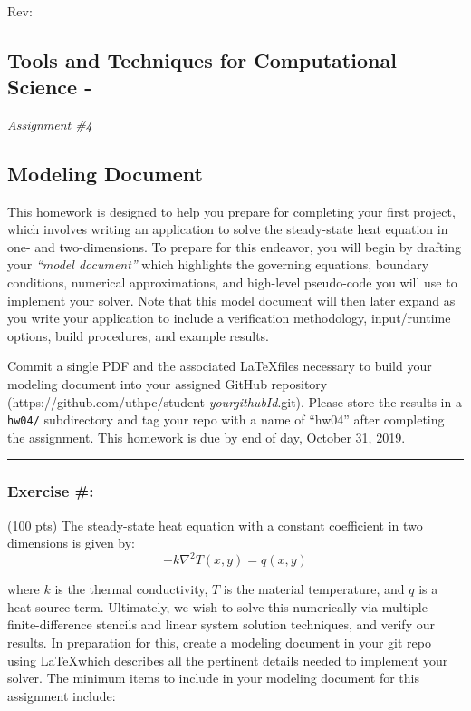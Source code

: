 \documentclass[letterpaper,12pt]{article}
\newcounter{exanum}
\newcommand{\exercise}{\subsubsection*{Exercise \#\theexanum: \refstepcounter{exanum}}}
\newcommand{\duedate}{end of day, October 31, 2019}
\begin{document}
\begin{flushright}
\VCDateISO \\
Rev: \VCRevision
\end{flushright}

\vspace*{0.05cm}
\subsection*{Tools and Techniques for Computational Science - \courseyear{}}
\vspace*{-.2cm}
{{\large \em Assignment \#4}

\vspace*{5pt}

\subsection*{Modeling Document}

This homework is designed to help you prepare for completing your
first project, which involves writing an application to solve the steady-state heat
equation in one- and two-dimensions. To prepare for this endeavor, you will
begin by drafting your {\em ``model document''} which highlights the
governing equations, boundary conditions, numerical approximations,
and high-level pseudo-code you will use to implement your
solver. Note that this model document will then later expand as you write your
application to include a verification methodology, input/runtime
options, build procedures, and example results.

Commit a single PDF and the associated \LaTeX files necessary to build your
modeling document into 
your assigned GitHub repository
(https://github.com/uthpc/student-{\em yourgithubId}.git).  Please
store the results in a \texttt{hw04/} subdirectory and tag your repo with a
name of ``hw04'' after completing the assignment. This homework is due by \duedate. \\

\rule{\textwidth}{0.4pt} 

\exercise

(100 pts) The steady-state heat equation with a constant coefficient in two dimensions is 
given by:
\begin{equation}
-k\nabla^{2} T(x,y) = q(x,y)
\end{equation}

where $k$ is the thermal conductivity, $T$ is the material
temperature, and $q$ is a heat source term.  Ultimately, we wish to
solve this numerically via multiple finite-difference stencils and
linear system solution techniques, and verify our results. In
preparation for this, create a modeling document in your git repo
using \LaTeX which describes all the pertinent details needed to
implement your solver. The minimum items to include in your modeling
document for this assignment include:

}
\end{document}

